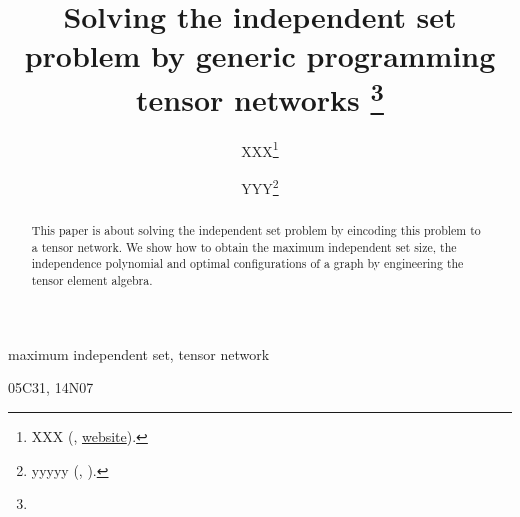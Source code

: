 \documentclass[review,onefignum,onetabnum]{siamart190516}
\title{Solving the independent set problem by generic programming tensor networks
\thanks{\funding{...}}
}
\author{XXX\thanks{XXX 
  (\email{email}, \url{website}).}
\and YYY\thanks{yyyyy 
  (\email{yyyy}, \email{email}).}
}
\newcommand{\<}{\langle}
\renewcommand{\>}{\rangle}
\begin{document}
\maketitle

\begin{abstract}
	This paper is about solving the independent set problem by eincoding this problem to a tensor network. 
    We show how to obtain the maximum independent set size, the independence polynomial and optimal configurations of a graph by engineering the tensor element algebra.
\end{abstract}

\begin{keywords}
  maximum independent set, tensor network
\end{keywords}

\begin{AMS}
  05C31, 14N07
\end{AMS}
\end{document}
